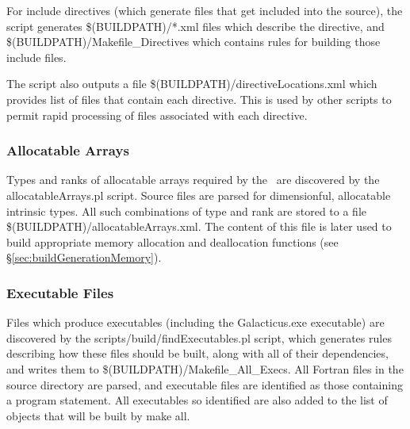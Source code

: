 For {\normalfont \ttfamily include} directives (which generate files that get included into the source), the script generates {\normalfont \ttfamily \$(BUILDPATH)/*.xml} files which describe the directive, and {\normalfont \ttfamily \$(BUILDPATH)/Makefile\_Directives} which contains rules for building those include files.

The script also outputs a file {\normalfont \ttfamily \$(BUILDPATH)/directiveLocations.xml} which provides list of files that contain each directive. This is used by other scripts to permit rapid processing of files associated with each directive.

\subsubsection{Allocatable Arrays}\label{sec:buildDiscoverAllocatables}

Types and ranks of allocatable arrays required by the \glc\ are discovered by the {\normalfont \ttfamily allocatableArrays.pl} script. Source files are parsed for dimensionful, allocatable intrinsic types. All such combinations of type and rank are stored to a file {\normalfont \ttfamily \$(BUILDPATH)/allocatableArrays.xml}. The content of this file is later used to build appropriate memory allocation and deallocation functions (see \S\ref{sec:buildGenerationMemory}).

\subsubsection{Executable Files}\label{sec:buildExecutables}

Files which produce executables (including the {\normalfont \ttfamily Galacticus.exe} executable) are discovered by the {\normalfont \ttfamily scripts/build/findExecutables.pl} script, which generates rules describing how these files should be built, along with all of their dependencies, and writes them to {\normalfont \ttfamily \$(BUILDPATH)/Makefile\_All\_Execs}. All Fortran files in the {\normalfont \ttfamily source} directory are parsed, and executable files are identified as those containing a {\normalfont \ttfamily program} statement. All executables so identified are also added to the list of objects that will be built by {\normalfont \ttfamily make all}.

